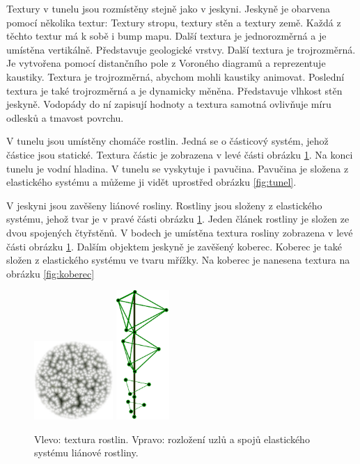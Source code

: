 Textury v tunelu jsou rozmístěny stejně jako v jeskyni.
Jeskyně je obarvena pomocí několika textur: Textury stropu, textury stěn a textury země.
Každá z těchto textur má k sobě i bump mapu.
Další textura je jednorozměrná a je umístěna vertikálně.
Představuje geologické vrstvy.
Další textura je trojrozměrná.
Je vytvořena pomocí distančního pole z Voroného diagramů a reprezentuje kaustiky.
Textura je trojrozměrná, abychom mohli kaustiky animovat.
Poslední textura je také trojrozměrná a je dynamicky měněna.
Před\-sta\-vu\-je vlhkost stěn jeskyně.
Vodopády do ní zapisují hodnoty a textura samotná ovlivňuje míru odlesků a tmavost povrchu.

V tunelu jsou umístěny chomáče rostlin.
Jedná se o částicový systém, jehož částice jsou statické.
Textura částic je zobrazena v levé části obrázku \ref{fig:listy}.
Na konci tunelu je vodní hladina.
V tunelu se vyskytuje i pavučina.
Pavučina je složena z elastického systému	a můžeme ji vidět uprostřed obrázku \ref{fig:tunel}.

V jeskyni jsou zavěšeny liánové rosliny.
Rostliny jsou složeny z elastického systému, jehož tvar je v pravé části obrázku \ref{fig:listy}.
Jeden článek rostliny je složen ze dvou spojených čtyřstěnů.
V bodech je umístěna textura rosliny zobrazena v levé části obrázku \ref{fig:listy}.
Dalším objektem jeskyně je zavěšený koberec.
Koberec je také složen z elastického systému ve tvaru mřížky.
Na koberec je nanesena textura na obrázku \ref{fig:koberec}

\begin{figure}[h]
\centering
\includegraphics[width=3cm,keepaspectratio]{obr/listy.jpg}
\includegraphics[width=2cm,keepaspectratio]{obr/liana.pdf}
\caption{Vlevo: textura rostlin.
Vpravo: rozložení uzlů a spojů elastického systému liánové rostliny.}
\label{fig:listy}
\end{figure}

